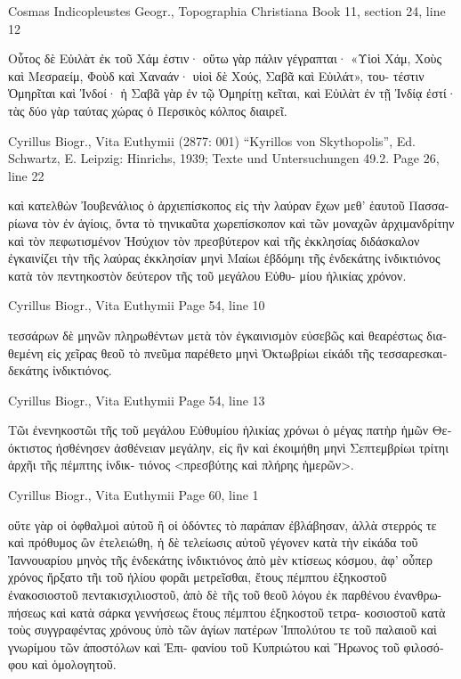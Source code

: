 \documentclass[12pt,letterpaper,twoside,final]{memoir}
\begin{document}
\begin{greek}
Cosmas Indicopleustes Geogr., Topographia Christiana 
Book 11, section 24, line 12

                        Οὗτος δὲ Εὐιλὰτ ἐκ τοῦ Χάμ ἐστιν· 
οὕτω γὰρ πάλιν γέγραπται· «Υἱοὶ Χάμ, Χοὺς καὶ Μεσραείμ, 
Φοὺδ καὶ Χαναάν· υἱοὶ δὲ Χούς, Σαβᾶ καὶ Εὐιλάτ», του-
τέστιν Ὁμηρῖται καὶ Ἰνδοί· ἡ Σαβᾶ γὰρ ἐν τῷ Ὁμηρίτῃ 
κεῖται, καὶ Εὐιλὰτ ἐν τῇ Ἰνδίᾳ ἐστί· τὰς δύο γὰρ ταύτας 
χώρας ὁ Περσικὸς κόλπος διαιρεῖ. 



Cyrillus Biogr., Vita Euthymii (2877: 001)
“Kyrillos von Skythopolis”, Ed. Schwartz, E.
Leipzig: Hinrichs, 1939; Texte und Untersuchungen 49.2.
Page 26, line 22

                καὶ κατελθὼν Ἰουβενάλιος ὁ ἀρχιεπίσκοπος εἰς τὴν 
λαύραν ἔχων μεθ' ἑαυτοῦ Πασσαρίωνα τὸν ἐν ἁγίοις, ὄντα τὸ τηνικαῦτα 
χωρεπίσκοπον καὶ τῶν μοναχῶν ἀρχιμανδρίτην καὶ τὸν πεφωτισμένον 
Ἡσύχιον τὸν πρεσβύτερον καὶ τῆς ἐκκλησίας διδάσκαλον ἐγκαινίζει 
τὴν τῆς λαύρας ἐκκλησίαν μηνὶ Μαίωι ἑβδόμηι τῆς ἑνδεκάτης 
ἰνδικτιόνος κατὰ τὸν πεντηκοστὸν δεύτερον τῆς τοῦ μεγάλου Εὐθυ-
μίου ἡλικίας χρόνον. 



Cyrillus Biogr., Vita Euthymii 
Page 54, line 10

τεσσάρων δὲ μηνῶν πληρωθέντων μετὰ τὸν ἐγκαινισμὸν εὐσεβῶς 
καὶ θεαρέστως διαθεμένη εἰς χεῖρας θεοῦ τὸ πνεῦμα παρέθετο μηνὶ 
Ὀκτωβρίωι εἰκάδι τῆς τεσσαρεσκαιδεκάτης ἰνδικτιόνος. 



Cyrillus Biogr., Vita Euthymii 
Page 54, line 13

Τῶι ἐνενηκοστῶι τῆς τοῦ μεγάλου Εὐθυμίου ἡλικίας χρόνωι ὁ 
μέγας πατὴρ ἡμῶν Θεόκτιστος ἠσθένησεν ἀσθένειαν μεγάλην, εἰς 
ἣν καὶ ἐκοιμήθη μηνὶ Σεπτεμβρίωι τρίτηι ἀρχῆι τῆς πέμπτης ἰνδικ-
τιόνος <πρεσβύτης καὶ πλήρης ἡμερῶν>. 



Cyrillus Biogr., Vita Euthymii 
Page 60, line 1

οὔτε γὰρ οἱ ὀφθαλμοὶ αὐτοῦ ἢ οἱ ὀδόντες τὸ παράπαν ἐβλάβησαν, 
ἀλλὰ στερρός τε καὶ πρόθυμος ὢν ἐτελειώθη, ἡ δὲ τελείωσις αὐτοῦ 
γέγονεν κατὰ τὴν εἰκάδα τοῦ Ἰαννουαρίου μηνὸς τῆς ἑνδεκάτης   
ἰνδικτιόνος ἀπὸ μὲν κτίσεως κόσμου, ἀφ' οὗπερ χρόνος ἤρξατο τῆι 
τοῦ ἡλίου φορᾶι μετρεῖσθαι, ἔτους πέμπτου ἑξηκοστοῦ ἐνακοσιοστοῦ 
πεντακισχιλιοστοῦ, ἀπὸ δὲ τῆς τοῦ θεοῦ λόγου ἐκ παρθένου ἐνανθρω-
πήσεως καὶ κατὰ σάρκα γεννήσεως ἔτους πέμπτου ἑξηκοστοῦ τετρα-
κοσιοστοῦ κατὰ τοὺς συγγραφέντας χρόνους ὑπὸ τῶν ἁγίων πατέρων 
Ἱππολύτου τε τοῦ παλαιοῦ καὶ γνωρίμου τῶν ἀποστόλων καὶ Ἐπι-
φανίου τοῦ Κυπριώτου καὶ Ἥρωνος τοῦ φιλοσόφου καὶ ὁμολογητοῦ. 




\end{greek}
\end{document}
